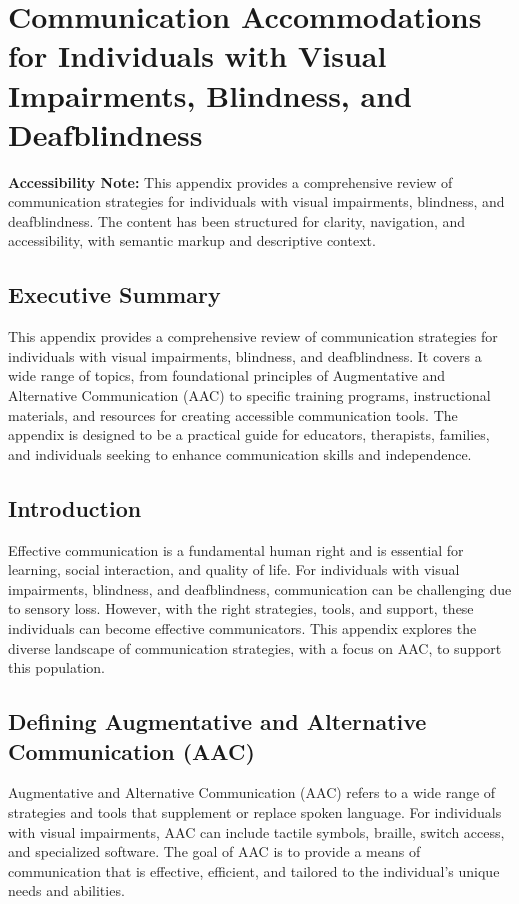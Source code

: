 \chapter{Communication Accommodations for Individuals with Visual Impairments, Blindness, and Deafblindness}\label{app6:appx6}

\begin{raggedright}
	\textbf{Accessibility Note:} This appendix provides a comprehensive review of communication strategies for individuals with visual impairments, blindness, and deafblindness. The content has been structured for clarity, navigation, and accessibility, with semantic markup and descriptive context.
\end{raggedright}

\section{Executive Summary}\label{app6:exec-summary}
This appendix provides a comprehensive review of communication strategies for individuals with visual impairments, blindness, and deafblindness. It covers a wide range of topics, from foundational principles of Augmentative and Alternative Communication (AAC) to specific training programs, instructional materials, and resources for creating accessible communication tools. The appendix is designed to be a practical guide for educators, therapists, families, and individuals seeking to enhance communication skills and independence.

\section{Introduction}\label{app6:intro}
Effective \gls{communication} is a fundamental human right and is essential for learning, social interaction, and quality of life. For individuals with visual impairments, blindness, and deafblindness, \gls{communication} can be challenging due to sensory loss. However, with the right strategies, tools, and support, these individuals can become effective communicators. This appendix explores the diverse landscape of \gls{communication} strategies, with a focus on AAC, to support this population.

\section{Defining Augmentative and Alternative Communication (AAC)}\label{app6:define-aac}
Augmentative and Alternative Communication (AAC) refers to a wide range of strategies and tools that supplement or replace spoken language. For individuals with visual impairments, AAC can include tactile symbols, braille, switch access, and specialized software. The goal of AAC is to provide a means of communication that is effective, efficient, and tailored to the individual's unique needs and abilities.

